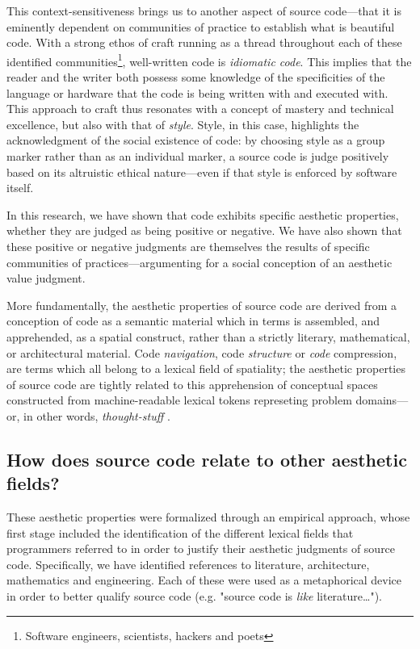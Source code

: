 This context-sensitiveness brings us to another aspect of source code—that it is eminently dependent on communities of practice to establish what is beautiful code. With a strong ethos of craft running as a thread throughout each of these identified communities\footnote{Software engineers, scientists, hackers and poets}, well-written code is \emph{idiomatic code}. This implies that the reader and the writer both possess some knowledge of the specificities of the language or hardware that the code is being written with and executed with. This approach to craft thus resonates with a concept of mastery and technical excellence, but also with that of \emph{style}. Style, in this case, highlights the acknowledgment of the social existence of code: by choosing style as a group marker rather than as an individual marker, a source code is judge positively based on its altruistic ethical nature—even if that style is enforced by software itself.

In this research, we have shown that code exhibits specific aesthetic properties, whether they are judged as being positive or negative. We have also shown that these positive or negative judgments are themselves the results of specific communities of practices—argumenting for a social conception of an aesthetic value judgment.

More fundamentally, the aesthetic properties of source code are derived from a conception of code as a semantic material which in terms is assembled, and apprehended, as a spatial construct, rather than a strictly literary, mathematical, or architectural material. Code \emph{navigation}, code \emph{structure} or \emph{code} compression, are terms which all belong to a lexical field of spatiality; the aesthetic properties of source code are tightly related to this apprehension of conceptual spaces constructed from machine-readable lexical tokens represeting problem domains—or, in other words, \emph{thought-stuff} \citep{brooks_mythical_1975}.

\subsection{How does source code relate to other aesthetic fields?}
\label{subsec:conclusion-rq-2}

These aesthetic properties were formalized through an empirical approach, whose first stage included the identification of the different lexical fields that programmers referred to in order to justify their aesthetic judgments of source code. Specifically, we have identified references to literature, architecture, mathematics and engineering. Each of these were used as a metaphorical device in order to better qualify source code (e.g. "source code is \emph{like} literature\dots").

